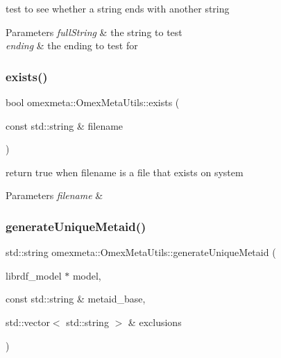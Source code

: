 test to see whether a string ends with another string 


\begin{DoxyParams}{Parameters}
{\em full\+String} & the string to test \\
\hline
{\em ending} & the ending to test for \\
\hline
\end{DoxyParams}
\mbox{\label{classomexmeta_1_1OmexMetaUtils_ab72b362607e6bbdd0025eefa574cd073}} 
\subsubsection{\texorpdfstring{exists()}{exists()}}
{\footnotesize\ttfamily bool omexmeta\+::\+Omex\+Meta\+Utils\+::exists (\begin{DoxyParamCaption}\item[{const std\+::string \&}]{filename }\end{DoxyParamCaption})\hspace{0.3cm}{\ttfamily [static]}}



return true when filename is a file that exists on system 


\begin{DoxyParams}{Parameters}
{\em filename} & \\
\hline
\end{DoxyParams}
\mbox{\label{classomexmeta_1_1OmexMetaUtils_a4700231d455a5f65f7cc290d98d2b0ec}} 
\subsubsection{\texorpdfstring{generate\+Unique\+Metaid()}{generateUniqueMetaid()}}
{\footnotesize\ttfamily std\+::string omexmeta\+::\+Omex\+Meta\+Utils\+::generate\+Unique\+Metaid (\begin{DoxyParamCaption}\item[{librdf\+\_\+model $\ast$}]{model,  }\item[{const std\+::string \&}]{metaid\+\_\+base,  }\item[{std\+::vector$<$ std\+::string $>$ \&}]{exclusions }\end{DoxyParamCaption})\hspace{0.3cm}{\ttfamily [static]}}



